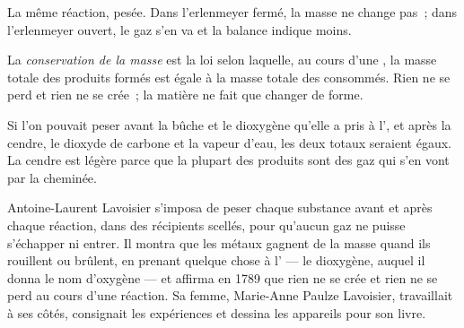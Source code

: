 \begin{omfigure}

{\small La même réaction, pesée. Dans l'erlenmeyer fermé, la masse ne
change pas~; dans l'erlenmeyer ouvert, le gaz s'en va et la balance
indique moins.}
\end{omfigure}

\begin{definition}\label{def:g8:balanced-equations:conservation}
La \emph{conservation de la masse} est
la loi selon laquelle, au cours d'une , la masse totale
des produits formés est égale à la masse totale des  consommés.
Rien ne se perd et rien ne se crée~; la matière ne fait que changer de
forme.
\end{definition}

\begin{example}\label{ex:g8:balanced-equations:log}
Si l'on pouvait peser avant la bûche et le dioxygène qu'elle a pris à
l', et après la cendre, le dioxyde de carbone et la vapeur d'eau, les
deux totaux seraient égaux. La cendre est légère parce que la plupart
des produits sont des gaz qui s'en vont par la cheminée.
\end{example}

\begin{history}
Antoine-Laurent Lavoisier s'imposa de peser chaque substance avant et
après chaque réaction, dans des récipients scellés, pour qu'aucun gaz ne
puisse s'échapper ni entrer. Il montra que les métaux gagnent de la masse
quand ils rouillent ou brûlent, en prenant quelque chose à l' --- le
dioxygène, auquel il donna le nom d'oxygène --- et affirma en 1789 que
rien ne se crée et rien ne se perd au cours d'une réaction. Sa femme,
Marie-Anne Paulze Lavoisier, travaillait à ses côtés, consignait les
expériences et dessina les appareils pour son livre.
\end{history}

